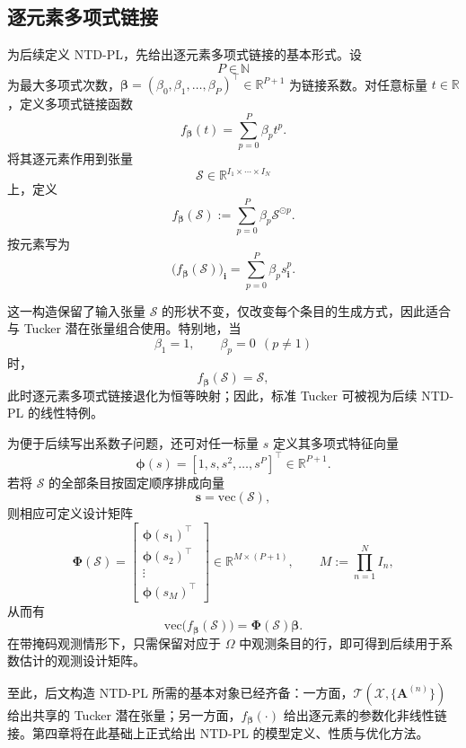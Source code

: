 \subsection{逐元素多项式链接}

为后续定义 NTD-PL，先给出逐元素多项式链接的基本形式。设
\[
P\in\mathbb{N}
\]
为最大多项式次数，$\boldsymbol{\beta}=(\beta_0,\beta_1,\dots,\beta_P)^\top\in\mathbb{R}^{P+1}$ 为链接系数。对任意标量 $t\in\mathbb{R}$，定义多项式链接函数
\[
f_{\boldsymbol{\beta}}(t)
=
\sum_{p=0}^P \beta_p t^p.
\]
将其逐元素作用到张量
\[
\mathcal{S}\in\mathbb{R}^{I_1\times\cdots\times I_N}
\]
上，定义
\[
f_{\boldsymbol{\beta}}(\mathcal{S})
:=
\sum_{p=0}^P \beta_p \mathcal{S}^{\odot p}.
\]
按元素写为
\[
\bigl(f_{\boldsymbol{\beta}}(\mathcal{S})\bigr)_{\mathbf{i}}
=
\sum_{p=0}^P \beta_p s_{\mathbf{i}}^p.
\]

这一构造保留了输入张量 $\mathcal{S}$ 的形状不变，仅改变每个条目的生成方式，因此适合与 Tucker 潜在张量组合使用。特别地，当
\[
\beta_1 = 1,\qquad
\beta_p = 0\ \ (p\neq 1)
\]
时，
\[
f_{\boldsymbol{\beta}}(\mathcal{S})=\mathcal{S},
\]
此时逐元素多项式链接退化为恒等映射；因此，标准 Tucker 可被视为后续 NTD-PL 的线性特例。

为便于后续写出系数子问题，还可对任一标量 $s$ 定义其多项式特征向量
\[
\boldsymbol{\phi}(s)
=
[1,s,s^2,\dots,s^P]^\top \in \mathbb{R}^{P+1}.
\]
若将 $\mathcal{S}$ 的全部条目按固定顺序排成向量
\[
\mathbf{s}=\mathrm{vec}(\mathcal{S}),
\]
则相应可定义设计矩阵
\[
\mathbf{\Phi}(\mathcal{S})
=
\begin{bmatrix}
\boldsymbol{\phi}(s_1)^\top\\
\boldsymbol{\phi}(s_2)^\top\\
\vdots\\
\boldsymbol{\phi}(s_M)^\top
\end{bmatrix}
\in \mathbb{R}^{M\times (P+1)},
\qquad
M:=\prod_{n=1}^N I_n,
\]
从而有
\[
\mathrm{vec}\bigl(f_{\boldsymbol{\beta}}(\mathcal{S})\bigr)
=
\mathbf{\Phi}(\mathcal{S})\boldsymbol{\beta}.
\]
在带掩码观测情形下，只需保留对应于 $\Omega$ 中观测条目的行，即可得到后续用于系数估计的观测设计矩阵。

至此，后文构造 NTD-PL 所需的基本对象已经齐备：一方面，$\mathcal{T}(\mathcal{X},\{\mathbf{A}^{(n)}\})$ 给出共享的 Tucker 潜在张量；另一方面，$f_{\boldsymbol{\beta}}(\cdot)$ 给出逐元素的参数化非线性链接。第四章将在此基础上正式给出 NTD-PL 的模型定义、性质与优化方法。